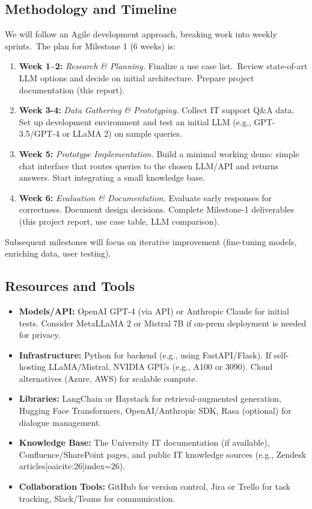\documentclass{article.cls}
\begin{document}
    \subsection{Methodology and Timeline}
    We will follow an Agile development approach, breaking work into weekly sprints.\ The plan for Milestone 1 (6 weeks) is:
    \begin{enumerate}
        \item \textbf{Week 1--2:} \textit{ Research \& Planning.} Finalize a use case list.\ Review state-of-art LLM options and decide on initial architecture.
        Prepare project documentation (this report).
        \item \textbf{Week 3-4:} \textit{Data Gathering \& Prototyping.} Collect IT support Q\&A data.
        Set up development environment and test an initial LLM (e.g., GPT-3.5/GPT-4 or LLaMA 2) on sample queries.
        \item \textbf{Week 5:} \textit{Prototype Implementation.} Build a minimal working demo: simple chat interface that routes queries to the chosen LLM/API and returns answers. Start integrating a small knowledge base.
        \item \textbf{Week 6:} \textit{Evaluation \& Documentation.} Evaluate early responses for correctness. Document design decisions. Complete Milestone-1 deliverables (this project report, use case table, LLM comparison).
    \end{enumerate}
    Subsequent milestones will focus on iterative improvement (fine-tuning models, enriching data, user testing).

    \subsection{Resources and Tools}
    \begin{itemize}
        \item \textbf{Models/API:} OpenAI GPT-4 (via API) or Anthropic Claude for initial tests. Consider Meta\rqs LLaMA 2 or Mistral 7B if on-prem deployment is needed for privacy.
        \item \textbf{Infrastructure:} Python for backend (e.g., using FastAPI/Flask). If self-hosting LLaMA/Mistral, NVIDIA GPUs (e.g., A100 or 3090). Cloud alternatives (Azure, AWS) for scalable compute.
        \item \textbf{Libraries:} LangChain or Haystack for retrieval-augmented generation, Hugging Face Transformers, OpenAI/Anthropic SDK, Rasa (optional) for dialogue management.
        \item \textbf{Knowledge Base:} The University IT documentation (if available), Confluence/SharePoint pages, and public IT knowledge sources (e.g., Zendesk articles[oaicite:26]{index=26}).
        \item \textbf{Collaboration Tools:} GitHub for version control, Jira or Trello for task tracking, Slack/Teams for communication.
    \end{itemize}
\end{document}
